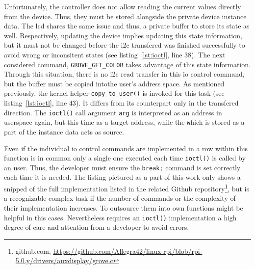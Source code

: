 Unfortunately, the controller does not allow reading the current values directly from the device.
Thus, they must be stored alongside the private device instance data.
The \ac{lcd} shares the same issue and thus, a private buffer to store its state as well.
Respectively, updating the device implies updating this state information, but it must not be changed before the \ac{i2c} transfered was finished successfully to avoid wrong or inconsitent states (see listing~\ref{lst:ioctl}, line 38).
The next considered command, \texttt{GROVE_GET_COLOR} takes advantage of this state information.
Through this situation, there is no \ac{i2c} read transfer in this \ac{io} control command, but the buffer must be copied intothe user's address space.
As mentioned previously, the kernel helper \texttt{copy_to_user()} is invoked for this task (see listing~\ref{lst:ioctl}, line 43).
It differs from its counterpart only in the transfered direction.
The \texttt{ioctl()} call argument \texttt{arg} is interpreted as an address in userspace again, but this time as a target address, while the \texttt which is stored as a part of the instance data acts as source.

Even if the individual \ac{io} control commands are implemented in a row within this function is in common only a single one executed each time \texttt{ioctl()} is called by an user.
Thus, the developer must ensure the \texttt{break;} command is set correctly each time it is needed.
The listing pictured as a part of this work only shows a snipped of the full implementation listed in the related Github repository\footnote{github.com, \url{https://github.com/Allegra42/linux-rpi/blob/rpi-5.0.y/drivers/auxdisplay/grove.c}}, but is a recognizable complex task if the number of commands or the complexity of their implementation increases. 
To outsource them into own functions might be helpful in this cases. 
Nevertheless requires an \texttt{ioctl()} implementation a high degree of care and attention from a developer to avoid errors.


